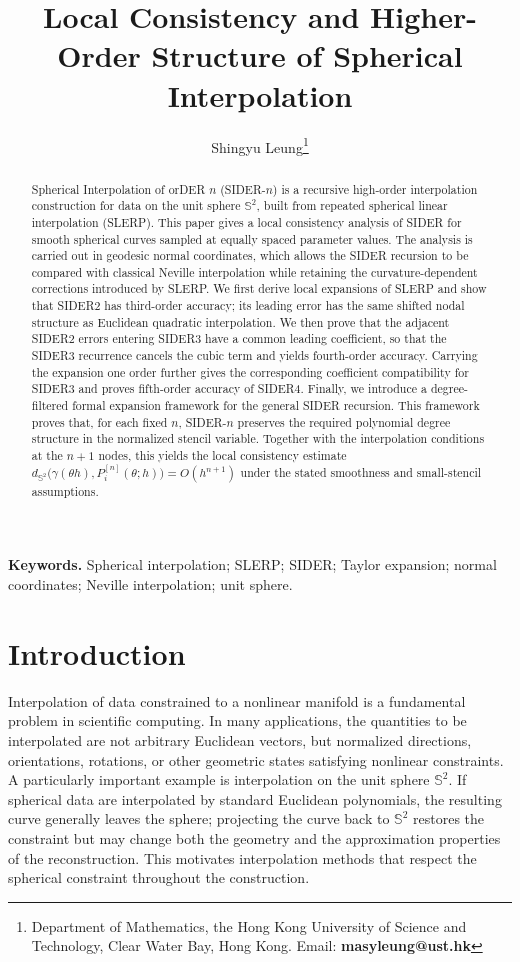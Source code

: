 \documentclass[a4paper,11pt]{article}
\title{Local Consistency and Higher-Order Structure of Spherical Interpolation}
\author{
Shingyu Leung\thanks{Department of Mathematics, the Hong Kong University of Science and Technology, Clear Water Bay, Hong Kong. Email: {\bf masyleung@ust.hk}}
}
\date{}
\newcommand{\bS}{\mathbb{S}}
\numberwithin{equation}{section}
\begin{document}
\thispagestyle{plain}
\maketitle

\begin{abstract}
Spherical Interpolation of orDER \(n\) (SIDER-\(n\)) is a recursive
high-order interpolation construction for data on the unit sphere \(\bS^2\),
built from repeated spherical linear interpolation (SLERP).  This paper gives
a local consistency analysis of SIDER for smooth spherical curves sampled at
equally spaced parameter values.  The analysis is carried out in geodesic
normal coordinates, which allows the SIDER recursion to be compared with
classical Neville interpolation while retaining the curvature-dependent
corrections introduced by SLERP.  We first derive local expansions of SLERP and
show that SIDER2 has third-order accuracy; its leading error has the same
shifted nodal structure as Euclidean quadratic interpolation.  We then prove
that the adjacent SIDER2 errors entering SIDER3 have a common leading
coefficient, so that the SIDER3 recurrence cancels the cubic term and yields
fourth-order accuracy.  Carrying the expansion one order further gives the
corresponding coefficient compatibility for SIDER3 and proves fifth-order
accuracy of SIDER4.  Finally, we introduce a degree-filtered formal expansion
framework for the general SIDER recursion.  This framework proves that, for
each fixed \(n\), SIDER-\(n\) preserves the required polynomial degree
structure in the normalized stencil variable.  Together with the interpolation
conditions at the \(n+1\) nodes, this yields the local consistency estimate
$d_{\bS^2}\bigl(\gamma(\theta h),P_i^{[n]}(\theta;h)\bigr)
        =O(h^{n+1})$ under the stated smoothness and small-stencil assumptions.
\end{abstract}

\noindent\textbf{Keywords.} Spherical interpolation; SLERP; SIDER; Taylor expansion;
normal coordinates; Neville interpolation; unit sphere.

\section{Introduction}

Interpolation of data constrained to a nonlinear manifold is a fundamental
problem in scientific computing.  In many applications, the quantities to be
interpolated are not arbitrary Euclidean vectors, but normalized directions,
orientations, rotations, or other geometric states satisfying nonlinear
constraints.  A particularly important example is interpolation on the unit
sphere \(\bS^2\).  If spherical data are interpolated by standard Euclidean
polynomials, the resulting curve generally leaves the sphere; projecting the
curve back to \(\bS^2\) restores the constraint but may change both the
geometry and the approximation properties of the reconstruction.  This
motivates interpolation methods that respect the spherical constraint
throughout the construction.
\end{document}
